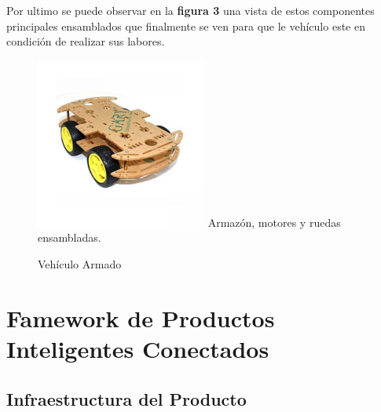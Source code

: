 \documentclass[osajnl,twocolumn,showpacs,superscriptaddress,10pt]{revtex4-1}
\begin{document}
Por ultimo se puede observar en la \textbf{figura 3} una vista de estos componentes principales ensamblados que finalmente se ven para que le vehículo este en condición de realizar sus labores.

\begin{figure} [H] \centering 
\caption{Vehículo Armado}
\includegraphics[width=0.5\textwidth]{armazon.jpg} 
Armazón, motores y ruedas ensambladas.
\end{figure}

\section{Famework de Productos Inteligentes Conectados}
\subsection{Infraestructura del Producto}
\end{document}
